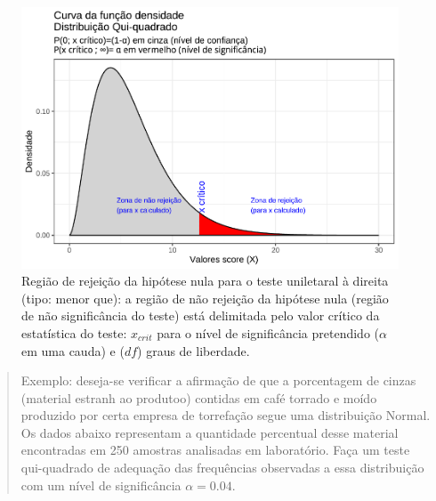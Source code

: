 \documentclass[
]{book}
\begin{document}
\begin{figure}

{\centering \includegraphics[width=1\linewidth]{apostila_files/figure-latex/fig97-1} 

}

\caption{Região de rejeição da hipótese nula para o teste uniletaral à direita (tipo: menor que): a região de não rejeição da hipótese nula (região de não significância do teste) está delimitada pelo valor crítico da estatística do teste: $x_{crit}$ para o nível de significância pretendido ($\alpha$ em uma cauda)  e ($df$) graus de liberdade.}\label{fig:fig97}
\end{figure}

\hfill\break

\begin{quote}
Exemplo: deseja-se verificar a afirmação de que a porcentagem de cinzas (material estranh ao produtoo) contidas em café torrado e moído produzido por certa empresa de torrefação segue uma distribuição Normal. Os dados abaixo representam a quantidade percentual desse material encontradas em 250 amostras analisadas em laboratório. Faça um teste qui-quadrado de adequação das frequências observadas a essa distribuição com um nível de significância \(\alpha=0.04\).
\end{quote}

\hfill\break
\end{document}
